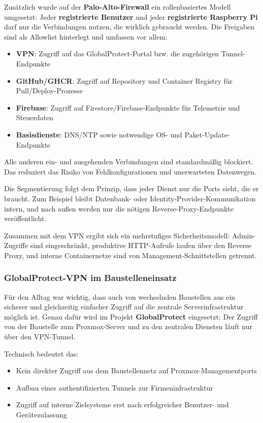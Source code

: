 Zusätzlich wurde auf der \textbf{Palo-Alto-Firewall} ein rollenbasiertes Modell umgesetzt: Jeder \textbf{registrierte Benutzer} und jeder \textbf{registrierte Raspberry Pi} darf nur die Verbindungen nutzen, die wirklich gebraucht werden. Die Freigaben sind als Allowlist hinterlegt und umfassen vor allem:

\begin{itemize}
    \item \textbf{VPN}: Zugriff auf das GlobalProtect-Portal bzw. die zugehörigen Tunnel-Endpunkte
    \item \textbf{GitHub/GHCR}: Zugriff auf Repository und Container Registry für Pull/Deploy-Prozesse
    \item \textbf{Firebase}: Zugriff auf Firestore/Firebase-Endpunkte für Telemetrie und Steuerdaten
    \item \textbf{Basisdienste}: DNS/NTP sowie notwendige OS- und Paket-Update-Endpunkte
\end{itemize}

Alle anderen ein- und ausgehenden Verbindungen sind standardmäßig blockiert. Das reduziert das Risiko von Fehlkonfigurationen und unerwarteten Datenwegen.

Die Segmentierung folgt dem Prinzip, dass jeder Dienst nur die Ports sieht, die er braucht. Zum Beispiel bleibt Datenbank- oder Identity-Provider-Kommunikation intern, und nach außen werden nur die nötigen Reverse-Proxy-Endpunkte veröffentlicht.

Zusammen mit dem VPN ergibt sich ein mehrstufiges Sicherheitsmodell: Admin-Zugriffe sind eingeschränkt, produktive HTTP-Aufrufe laufen über den Reverse Proxy, und interne Containernetze sind von Management-Schnittstellen getrennt.

\subsubsection{GlobalProtect-VPN im Baustelleneinsatz}

Für den Alltag war wichtig, dass auch von wechselnden Baustellen aus ein sicherer und gleichzeitig einfacher Zugriff auf die zentrale Serverinfrastruktur möglich ist. Genau dafür wird im Projekt \textbf{GlobalProtect} eingesetzt: Der Zugriff von der Baustelle zum Proxmox-Server und zu den zentralen Diensten läuft nur über den VPN-Tunnel.

Technisch bedeutet das:

\begin{itemize}
    \item Kein direkter Zugriff aus dem Baustellennetz auf Proxmox-Managementports
    \item Aufbau eines authentifizierten Tunnels zur Firmeninfrastruktur
    \item Zugriff auf interne Zielsysteme erst nach erfolgreicher Benutzer- und Gerätezulassung
\end{itemize}

